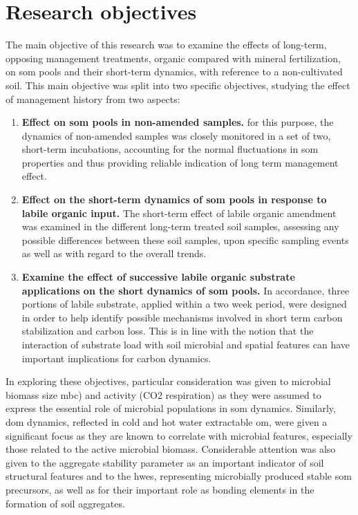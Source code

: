 \section{Research objectives}

	The main objective of this research was to examine the effects of long-term, opposing management treatments, organic compared with mineral fertilization, on \gls{som} pools and their short-term dynamics, with reference to a non-cultivated soil.
	This main objective was split into two specific objectives, studying the effect of management history from two aspects:
	\begin{enumerate}
		\item \textbf{Effect on \gls{som} pools in non-amended samples.} for this purpose, the dynamics of non-amended samples was closely monitored in a set of two, short-term incubations, accounting for the normal fluctuations in \gls{som} properties and thus providing reliable indication of long term management effect.
		\item \textbf{Effect on the short-term dynamics of \gls{som} pools in response to labile organic input.} The short-term effect of labile organic amendment was examined in the different long-term treated soil samples, assessing any possible differences between these soil samples, upon specific sampling events as well as with regard to the overall trends.


		\item \textbf{Examine the effect of successive labile organic substrate applications on the short dynamics of \gls{som} pools.} In accordance, three portions of labile substrate, applied within a two week period, were designed in  order to help identify possible mechanisms involved in short term carbon stabilization and carbon loss. This is in line with the notion that the interaction of substrate load with soil microbial and spatial features can have important implications for carbon dynamics.
	\end{enumerate}
	In exploring these objectives, particular consideration was given to microbial biomass size \gls{mbc})  and activity (CO2 respiration) as they were assumed to express the essential role of microbial populations in \gls{som} dynamics. Similarly, \gls{dom} dynamics, reflected in cold and hot water extractable \gls{om}, were given a significant focus as they are known to correlate with microbial features, especially those related to the active microbial biomass.  Considerable attention was also given to the aggregate stability parameter as an important indicator of soil structural features and to the \gls{hwes}, representing microbially produced stable \gls{som} precursors, as well as for their important role as bonding elements in the formation of soil aggregates.

